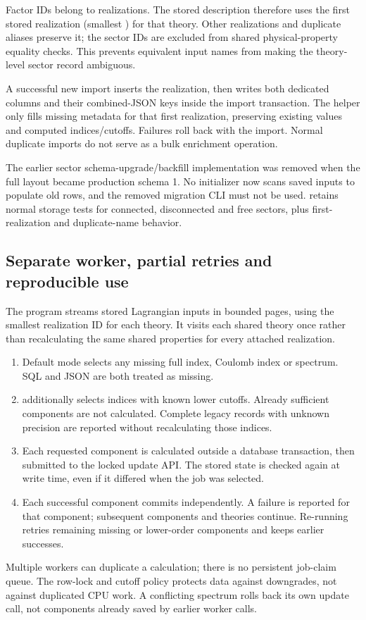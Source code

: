 Factor IDs belong to realizations. The stored description therefore uses the
first stored realization (smallest ) for that
theory. Other realizations and duplicate aliases preserve it; the sector IDs
are excluded from shared physical-property equality checks. This prevents
equivalent input names from making the theory-level sector record ambiguous.

A successful new import inserts the realization, then
 writes both dedicated columns and their
combined-JSON keys inside the import transaction. The helper only fills
missing metadata for that first realization, preserving existing values and
computed indices/cutoffs. Failures roll back with the import. Normal duplicate
imports do not serve as a bulk enrichment operation.

The earlier sector schema-upgrade/backfill implementation was removed when
the full layout became production schema 1. No initializer now scans saved
inputs to populate old rows, and the removed migration CLI must not be used.
 retains normal storage tests for connected,
disconnected and free sectors, plus first-realization and duplicate-name behavior.

\clearpage
\subsection{Separate worker, partial retries and reproducible use}
The program  streams stored Lagrangian
inputs in bounded pages, using the smallest realization ID for each theory.
It visits each shared theory once rather than recalculating the same shared
properties for every attached realization.
\begin{enumerate}
\item Default mode selects any missing full index, Coulomb index or spectrum.
SQL  and JSON  are both treated as missing.
\item {} additionally selects indices with known lower cutoffs.
Already sufficient components are not calculated. Complete legacy records with
unknown precision are reported without recalculating those indices.
\item Each requested component is calculated outside a database transaction,
then submitted to the locked update API. The stored state is checked again at
write time, even if it differed when the job was selected.
\item Each successful component commits independently. A failure is reported
for that component; subsequent components and theories continue. Re-running
retries remaining missing or lower-order components and keeps earlier successes.
\end{enumerate}
Multiple workers can duplicate a calculation; there is no persistent job-claim
queue. The row-lock and cutoff policy protects data against downgrades, not
against duplicated CPU work. A conflicting spectrum rolls back its own update
call, not components already saved by earlier worker calls.

